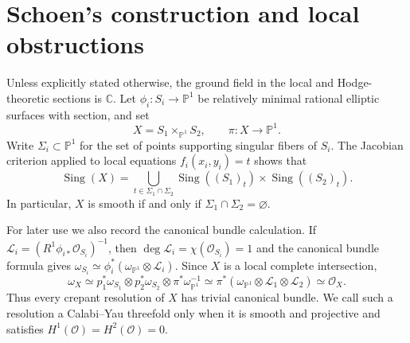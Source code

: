 \documentclass[a4paper]{amsart}
\theoremstyle{plain}
\theoremstyle{definition}
\theoremstyle{remark}
\numberwithin{equation}{section}
\newcommand{\CC}{\mathbb{C}}
\newcommand{\PP}{\mathbb{P}}
\begin{document}

\section{Schoen's construction and local obstructions}

Unless explicitly stated otherwise, the ground field in the local and
Hodge-theoretic sections is $\CC$.  Let
$\phi_i\colon S_i\to\PP^1$ be relatively minimal rational elliptic surfaces
with section, and set
\[
X=S_1\times_{\PP^1}S_2,
\qquad \pi\colon X\longrightarrow\PP^1.
\]
Write $\Sigma_i\subset\PP^1$ for the set of points supporting singular
fibers of $S_i$.  The Jacobian criterion applied to local equations
$f_i(x_i,y_i)=t$ shows that
\[
\operatorname{Sing}(X)=
\bigcup_{t\in\Sigma_1\cap\Sigma_2}
\operatorname{Sing}((S_1)_t)\times
\operatorname{Sing}((S_2)_t).
\]
In particular, $X$ is smooth if and only if
$\Sigma_1\cap\Sigma_2=\varnothing$.

For later use we also record the canonical bundle calculation.  If
$\mathcal L_i=(R^1\phi_{i*}\mathcal O_{S_i})^{-1}$, then
$\deg\mathcal L_i=\chi(\mathcal O_{S_i})=1$ and the canonical bundle formula
gives $\omega_{S_i}\simeq\phi_i^*(\omega_{\PP^1}\otimes\mathcal L_i)$.
Since $X$ is a local complete intersection,
\[
\omega_X\simeq
p_1^*\omega_{S_1}\otimes p_2^*\omega_{S_2}
\otimes\pi^*\omega_{\PP^1}^{-1}
\simeq\pi^*(\omega_{\PP^1}\otimes\mathcal L_1\otimes\mathcal L_2)
\simeq\mathcal O_X.
\]
Thus every crepant resolution of $X$ has trivial canonical bundle.  We call
such a resolution a Calabi--Yau threefold only when it is smooth and
projective and satisfies $H^1(\mathcal O)=H^2(\mathcal O)=0$.
\end{document}
